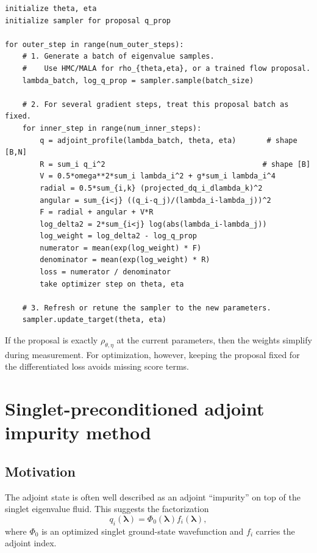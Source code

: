 \documentclass[11pt]{article}
\begin{document}
\begin{lstlisting}
initialize theta, eta
initialize sampler for proposal q_prop

for outer_step in range(num_outer_steps):
    # 1. Generate a batch of eigenvalue samples.
    #    Use HMC/MALA for rho_{theta,eta}, or a trained flow proposal.
    lambda_batch, log_q_prop = sampler.sample(batch_size)

    # 2. For several gradient steps, treat this proposal batch as fixed.
    for inner_step in range(num_inner_steps):
        q = adjoint_profile(lambda_batch, theta, eta)       # shape [B,N]
        R = sum_i q_i^2                                    # shape [B]
        V = 0.5*omega**2*sum_i lambda_i^2 + g*sum_i lambda_i^4
        radial = 0.5*sum_{i,k} (projected_dq_i_dlambda_k)^2
        angular = sum_{i<j} ((q_i-q_j)/(lambda_i-lambda_j))^2
        F = radial + angular + V*R
        log_delta2 = 2*sum_{i<j} log(abs(lambda_i-lambda_j))
        log_weight = log_delta2 - log_q_prop
        numerator = mean(exp(log_weight) * F)
        denominator = mean(exp(log_weight) * R)
        loss = numerator / denominator
        take optimizer step on theta, eta

    # 3. Refresh or retune the sampler to the new parameters.
    sampler.update_target(theta, eta)
\end{lstlisting}

If the proposal is exactly $\rho_{\theta,\eta}$ at the current parameters, then the weights simplify during measurement.  For optimization, however, keeping the proposal fixed for the differentiated loss avoids missing score terms.

\section{Singlet-preconditioned adjoint impurity method}

\subsection{Motivation}

The adjoint state is often well described as an adjoint ``impurity'' on top of the singlet eigenvalue fluid.  This suggests the factorization
\begin{equation}
q_i(\bm\lambda)=\Phi_0(\bm\lambda)f_i(\bm\lambda),
\end{equation}
where $\Phi_0$ is an optimized singlet ground-state wavefunction and $f_i$ carries the adjoint index.
\end{document}
